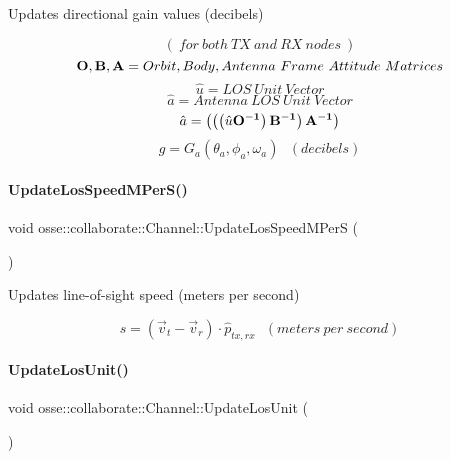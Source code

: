 Updates directional gain values (decibels) 

\[ (~for~both~TX~and~RX~nodes~) \] \[ {\bf{O}}, {\bf{B}}, {\bf{A}} = Orbit,Body,Antenna~Frame~Attitude~Matrices \] \[ \hat{u} = LOS~Unit~Vector \] \[ \hat{a} = Antenna~LOS~Unit~Vector \] \[ \hat{a} = \left(\left(\left(\hat{u}{\bf{O}^{-1}}\right) {\bf{B}^{-1}}\right){\bf{A}^{-1}}\right) \] \[ g = G_{a}(\theta_{a}, \phi_{a}, \omega_{a}) ~~~ (decibels) \] \mbox{\label{classosse_1_1collaborate_1_1_channel_a757a6ce4a001b986bf3ab746b37ec3b7}} 
\paragraph{\texorpdfstring{Update\+Los\+Speed\+M\+Per\+S()}{UpdateLosSpeedMPerS()}}
{\footnotesize\ttfamily void osse\+::collaborate\+::\+Channel\+::\+Update\+Los\+Speed\+M\+PerS (\begin{DoxyParamCaption}{ }\end{DoxyParamCaption})\hspace{0.3cm}{\ttfamily [private]}}



Updates line-\/of-\/sight speed (meters per second) 

\[ s = (\vec{v}_{t} - \vec{v}_{r}) \cdot \hat{p}_{tx,rx} ~~~ (meters~per~second) \] \mbox{\label{classosse_1_1collaborate_1_1_channel_a6fb6a52d46f410cb369e42be9a7213bf}} 
\paragraph{\texorpdfstring{Update\+Los\+Unit()}{UpdateLosUnit()}}
{\footnotesize\ttfamily void osse\+::collaborate\+::\+Channel\+::\+Update\+Los\+Unit (\begin{DoxyParamCaption}{ }\end{DoxyParamCaption})\hspace{0.3cm}{\ttfamily [private]}}




